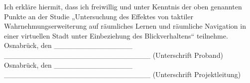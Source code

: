 Ich erkläre hiermit, dass ich freiwillig und unter Kenntnis der oben genannten Punkte an der Studie „Untersuchung des Effektes von taktiler Wahrnehmungserweiterung auf räumliches Lernen und räumliche Navigation in einer virtuellen Stadt unter Einbeziehung des Blickverhaltens“ teilnehme. \\


Osnabrück, den \_\_\_\_\_\_\_\_\_\_\_\_\_\_\_  \_\_\_\_\_\_\_\_\_\_\_\_\_\_\_\_\_\_\_\_\_\_\_\_\_\_\_\_ (Unterschrift Proband) \\


Osnabrück, den \_\_\_\_\_\_\_\_\_\_\_\_\_\_\_ \_\_\_\_\_\_\_\_\_\_\_\_\_\_\_\_\_\_\_\_\_\_\_\_\_\_\_\_ (Unterschrift Projektleitung)




